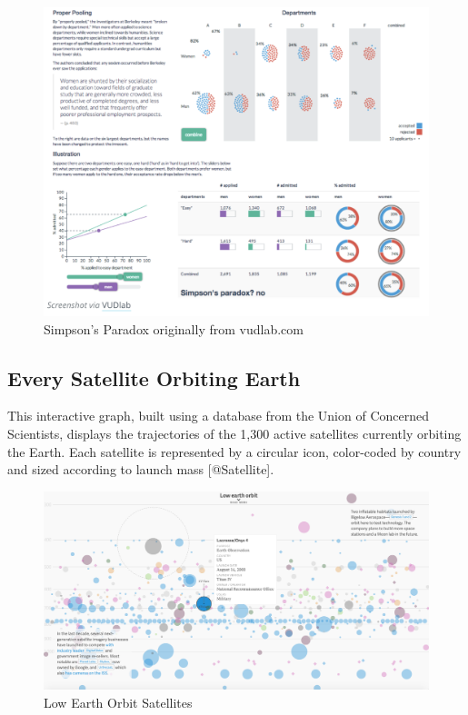 \documentclass[]{book}
\theoremstyle{definition}
\theoremstyle{definition}
\theoremstyle{definition}
\theoremstyle{remark}
\begin{document}
\begin{figure}
\centering
\includegraphics{images/VUD_simpsons.png}
\caption{Simpson's Paradox originally from vudlab.com}
\end{figure}

\subsection{Every Satellite Orbiting
Earth}\label{every-satellite-orbiting-earth}

This interactive graph, built using a database from the Union of
Concerned Scientists, displays the trajectories of the 1,300 active
satellites currently orbiting the Earth. Each satellite is represented
by a circular icon, color-coded by country and sized according to launch
mass {[}@Satellite{]}.

\begin{figure}
\centering
\includegraphics{images/satellites.png}
\caption{Low Earth Orbit Satellites}
\end{figure}
\end{document}
